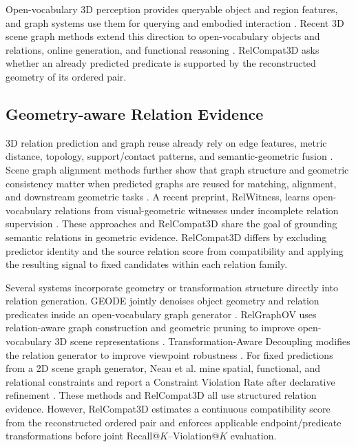 Open-vocabulary 3D perception provides queryable object and region features, and graph systems use them for querying and embodied interaction \cite{peng2023openscene,takmaz2023openmask3d,gu2024conceptgraphs,werby2024hierarchical,maggio2024clio}. Recent 3D scene graph methods extend this direction to open-vocabulary objects and relations, online generation, and functional reasoning \cite{koch2024open3dsg,chen2024clip,hou2025fross,zhang2025open,wang2025open}. RelCompat3D asks whether an already predicted predicate is supported by the reconstructed geometry of its ordered pair. 

\subsection{Geometry-aware Relation Evidence}
3D relation prediction and graph reuse already rely on edge features, metric distance, topology, support/contact patterns, and semantic-geometric fusion \cite{zhang2021exploiting,feng20233d,xie2024sg,huang2025fireplace,shao2025great,sarkar2023sgaligner}. Scene graph alignment methods further show that graph structure and geometric consistency matter when predicted graphs are reused for matching, alignment, and downstream geometric tasks \cite{sarkar2023sgaligner, xie2024sg}. A recent preprint, RelWitness, learns open-vocabulary relations from visual-geometric witnesses under incomplete relation supervision \cite{nguyen2026relwitness}. These approaches and RelCompat3D share the goal of grounding semantic relations in geometric evidence. RelCompat3D differs by excluding predictor identity and the source relation score from compatibility and applying the resulting signal to fixed candidates within each relation family. 

Several systems incorporate geometry or transformation structure directly into relation generation. GEODE jointly denoises object geometry and relation predicates inside an open-vocabulary graph generator \cite{feng2026geode}. RelGraphOV uses relation-aware graph construction and geometric pruning to improve open-vocabulary 3D scene representations \cite{chen2026beyond}. Transformation-Aware Decoupling modifies the relation generator to improve viewpoint robustness \cite{sun2026not}. For fixed predictions from a 2D scene graph generator, Neau et al. mine spatial, functional, and relational constraints and report a Constraint Violation Rate after declarative refinement \cite{neau2026visual}. These methods and RelCompat3D all use structured relation evidence. However, RelCompat3D estimates a continuous compatibility score from the reconstructed ordered pair and enforces applicable endpoint/predicate transformations before joint Recall@$K$--Violation@$K$ evaluation. 

